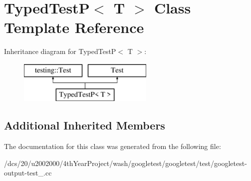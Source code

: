 \hypertarget{classTypedTestP}{}\section{Typed\+TestP$<$ T $>$ Class Template Reference}
\label{classTypedTestP}
Inheritance diagram for Typed\+TestP$<$ T $>$\+:\begin{figure}[H]
\begin{center}
\leavevmode
\includegraphics[height=2.000000cm]{classTypedTestP}
\end{center}
\end{figure}
\subsection*{Additional Inherited Members}


The documentation for this class was generated from the following file\+:\begin{DoxyCompactItemize}
\item 
/dcs/20/u2002000/4th\+Year\+Project/wash/googletest/googletest/test/googletest-\/output-\/test\+\_\+.\+cc\end{DoxyCompactItemize}
